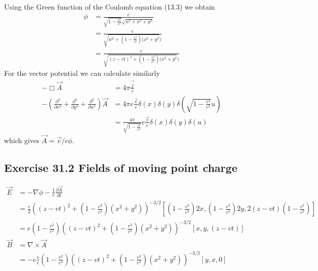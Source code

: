 \documentclass[../main.tex]{subfiles}
\begin{document}
Using the Green function of the Coulomb equation (13.3) we obtain
\begin{align}
    \phi&=\frac{e}{\sqrt{1-\frac{v^2}{c^2}}\sqrt{u^2+x^2+y^2}}\\
    &=\frac{e}{\sqrt{w^2+(1-\frac{v^2}{c^2})(x^2+y^2})}\\
    &=\frac{e}{\sqrt{(z-vt)^2+(1-\frac{v^2}{c^2})(x^2+y^2})}
\end{align}
For the vector potential we can calculate similarly
\begin{align}
    -\Box\vec{A}&=4\pi\frac{\vec{j}}{c}\\
    -\left(\frac{\partial^2}{\partial x^2}+\frac{\partial^2}{\partial y^2}+\frac{\partial^2}{\partial u^2}\right)\vec{A}&=4\pi e\frac{\vec{v}}{c}\delta(x)\delta(y)\delta\left(\sqrt{1-\frac{v^2}{c^2}}u\right)\\
    &=\frac{4\pi}{\sqrt{1-\frac{v^2}{c^2}}} e\frac{\vec{v}}{c}\delta(x)\delta(y)\delta\left(u\right)
\end{align}
which gives $\vec{A}=\vec{v}/c\phi$.

\subsection{Exercise 31.2 Fields of moving point charge}
\begin{align}
	\vec{E}&=-\nabla\phi-\frac{1}{c}\frac{\partial\vec{A}}{\partial t}\\
	&=\frac{e}{2}\left((z-vt)^2+(1-\frac{v^2}{c^2})(x^2+y^2)\right)^{-3/2}[(1-\frac{v^2}{c^2})2x,(1-\frac{v^2}{c^2})2y,2(z-vt)(1-\frac{v^2}{c^2})]\\
	&=e(1-\frac{v^2}{c^2})\left((z-vt)^2+(1-\frac{v^2}{c^2})(x^2+y^2)\right)^{-3/2}[x,y,(z-vt)]\\
	\vec{B}&=\nabla\times\vec{A}\\
	&=-e\frac{v}{c}(1-\frac{v^2}{c^2})\left((z-vt)^2+(1-\frac{v^2}{c^2})(x^2+y^2)\right)^{-3/2}[y,x,0]
\end{align}
\end{document}

